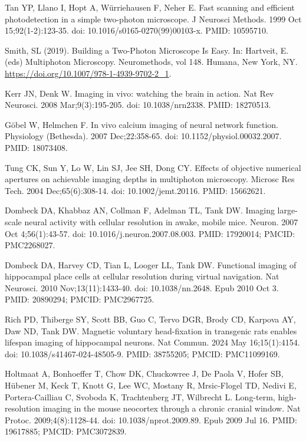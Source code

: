 \documentclass[10pt,letterpaper]{article}
\begin{document}
\begin{thebibliography}{10}
Tan YP, Llano I, Hopt A, Würriehausen F, Neher E. Fast scanning and efficient photodetection in a simple two-photon microscope. J Neurosci Methods. 1999 Oct 15;92(1-2):123-35. doi: 10.1016/s0165-0270(99)00103-x. PMID: 10595710.

Smith, SL (2019). Building a Two-Photon Microscope Is Easy. In: Hartveit, E. (eds) Multiphoton Microscopy. Neuromethods, vol 148. Humana, New York, NY. \url{https://doi.org/10.1007/978-1-4939-9702-2_1}.

Kerr JN, Denk W. Imaging in vivo: watching the brain in action. Nat Rev Neurosci. 2008 Mar;9(3):195-205. doi: 10.1038/nrn2338. PMID: 18270513.

G\"obel W, Helmchen F. In vivo calcium imaging of neural network function. Physiology (Bethesda). 2007 Dec;22:358-65. doi: 10.1152/physiol.00032.2007. PMID: 18073408.

Tung CK, Sun Y, Lo W, Lin SJ, Jee SH, Dong CY. Effects of objective numerical apertures on achievable imaging depths in multiphoton microscopy. Microsc Res Tech. 2004 Dec;65(6):308-14. doi: 10.1002/jemt.20116. PMID: 15662621.

Dombeck DA, Khabbaz AN, Collman F, Adelman TL, Tank DW. Imaging large-scale neural activity with cellular resolution in awake, mobile mice. Neuron. 2007 Oct 4;56(1):43-57. doi: 10.1016/j.neuron.2007.08.003. PMID: 17920014; PMCID: PMC2268027.

Dombeck DA, Harvey CD, Tian L, Looger LL, Tank DW. Functional imaging of hippocampal place cells at cellular resolution during virtual navigation. Nat Neurosci. 2010 Nov;13(11):1433-40. doi: 10.1038/nn.2648. Epub 2010 Oct 3. PMID: 20890294; PMCID: PMC2967725.

Rich PD, Thiberge SY, Scott BB, Guo C, Tervo DGR, Brody CD, Karpova AY, Daw ND, Tank DW. Magnetic voluntary head-fixation in transgenic rats enables lifespan imaging of hippocampal neurons. Nat Commun. 2024 May 16;15(1):4154. doi: 10.1038/s41467-024-48505-9. PMID: 38755205; PMCID: PMC11099169.

Holtmaat A, Bonhoeffer T, Chow DK, Chuckowree J, De Paola V, Hofer SB, Hübener M, Keck T, Knott G, Lee WC, Mostany R, Mrsic-Flogel TD, Nedivi E, Portera-Cailliau C, Svoboda K, Trachtenberg JT, Wilbrecht L. Long-term, high-resolution imaging in the mouse neocortex through a chronic cranial window. Nat Protoc. 2009;4(8):1128-44. doi: 10.1038/nprot.2009.89. Epub 2009 Jul 16. PMID: 19617885; PMCID: PMC3072839.


\end{thebibliography}
\end{document}
